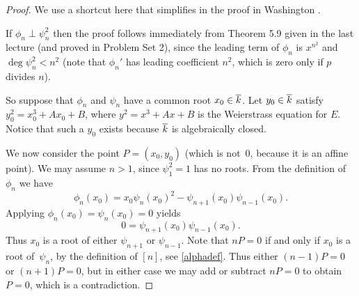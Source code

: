 \begin{proof}
We use a shortcut here that simplifies in the proof in Washington \cite[Corollary 3.7]{Wa08}.

If $\phi_n\perp \psi_n^2$ then the proof follows immediately from Theorem 5.9 given in the last lecture (and proved in Problem Set 2), since the leading term of $\phi_n$ is $x^{n^2}$ and $\deg \psi_n^2 < n^2$ (note that $\phi_n'$ has leading coefficient $n^2$, which is zero only if $p$ divides $n$).

So suppose that $\phi_n$ and $\psi_n$ have a common root $x_0\in\overline{k}$.
Let $y_0\in \overline{k}$ satisfy $y_0^2=x_0^3+Ax_0+B$, where $y^2=x^3+Ax+B$ is the Weierstrass equation for $E$.
Notice that such a $y_0$ exists because $\overline{k}$ is algebraically closed.

We now consider the point $P=(x_0,y_0)$ (which is not~0, because it is an affine point).
We may assume $n>1$, since $\psi_1^2=1$ has no roots.  From the definition of $\phi_n$ we have
\[
\phi_n(x_0)=x_0\psi_n(x_0)^2-\psi_{n+1}(x_0)\psi_{n-1}(x_0).
\] 
Applying $\phi_n(x_0)=\psi_n(x_0)=0$ yields
\[
0=\psi_{n+1}(x_0)\psi_{n-1}(x_0).
\]
Thus $x_0$ is a root of either $\psi_{n+1}$ or $\psi_{n-1}$.
Note that $nP=0$ if and only if $x_0$ is a root of~$\psi_n$, by the definition of $[n]$, see \eqref{alphadef}.
Thus either $(n-1)P=0$ or $(n+1)P=0$, but in either case we may add or subtract $nP=0$ to obtain $P=0$, which is a contradiction.
\end{proof}
%
%
%
